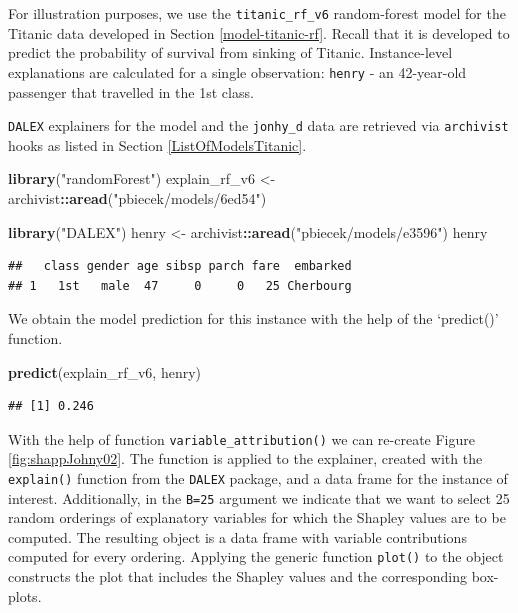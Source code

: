 \documentclass[]{krantz}
\newenvironment{Shaded}{\begin{snugshade}}{\end{snugshade}}
\newcommand{\KeywordTok}[1]{\textcolor[rgb]{0.13,0.29,0.53}{\textbf{#1}}}
\newcommand{\NormalTok}[1]{#1}
\newcommand{\OperatorTok}[1]{\textcolor[rgb]{0.81,0.36,0.00}{\textbf{#1}}}
\newcommand{\StringTok}[1]{\textcolor[rgb]{0.31,0.60,0.02}{#1}}
\begin{document}
For illustration purposes, we use the \texttt{titanic\_rf\_v6} random-forest model for the Titanic data developed in Section \ref{model-titanic-rf}. Recall that it is developed to predict the probability of survival from sinking of Titanic. Instance-level explanations are calculated for a single observation: \texttt{henry} - an 42-year-old passenger that travelled in the 1st class.

\texttt{DALEX} explainers for the model and the \texttt{jonhy\_d} data are retrieved via \texttt{archivist} hooks as listed in Section \ref{ListOfModelsTitanic}.

\begin{Shaded}
\begin{Highlighting}[]
\KeywordTok{library}\NormalTok{(}\StringTok{"randomForest"}\NormalTok{)}
\NormalTok{explain_rf_v6 <-}\StringTok{ }\NormalTok{archivist}\OperatorTok{::}\KeywordTok{aread}\NormalTok{(}\StringTok{"pbiecek/models/6ed54"}\NormalTok{)}

\KeywordTok{library}\NormalTok{(}\StringTok{"DALEX"}\NormalTok{)}
\NormalTok{henry <-}\StringTok{ }\NormalTok{archivist}\OperatorTok{::}\KeywordTok{aread}\NormalTok{(}\StringTok{"pbiecek/models/e3596"}\NormalTok{)}
\NormalTok{henry}
\end{Highlighting}
\end{Shaded}

\begin{verbatim}
##   class gender age sibsp parch fare  embarked
## 1   1st   male  47     0     0   25 Cherbourg
\end{verbatim}

We obtain the model prediction for this instance with the help of the `predict()' function.

\begin{Shaded}
\begin{Highlighting}[]
\KeywordTok{predict}\NormalTok{(explain_rf_v6, henry)}
\end{Highlighting}
\end{Shaded}

\begin{verbatim}
## [1] 0.246
\end{verbatim}

With the help of function \texttt{variable\_attribution()} we can re-create Figure \ref{fig:shappJohny02}. The function is applied to the explainer, created with the \texttt{explain()} function from the \texttt{DALEX} package, and a data frame for the instance of interest. Additionally, in the \texttt{B=25} argument we indicate that we want to select 25 random orderings of explanatory variables for which the Shapley values are to be computed. The resulting object is a data frame with variable contributions computed for every ordering. Applying the generic function \texttt{plot()} to the object constructs the plot that includes the Shapley values and the corresponding box-plots.
\end{document}
